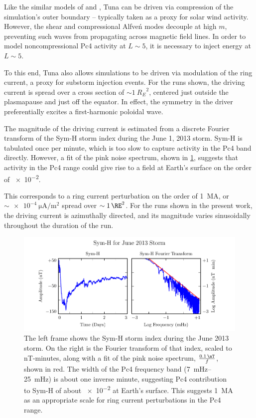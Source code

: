 \documentclass[draft,linenumbers]{agujournal}
\begin{document}

Like the similar models of \citet{lysak_2013} and \citet{waters_2013}, Tuna can be driven via compression of the simulation's outer boundary -- typically taken as a proxy for solar wind activity. However, the shear and compressional Alfve\'n modes decouple at high $m$, preventing such waves from propagating across magnetic field lines. In order to model noncompressional Pc4 activity at $L\sim5$, it is necessary to inject energy at $L\sim5$.

To this end, Tuna also allows simulations to be driven via modulation of the ring current, a proxy for substorm injection events. For the runs shown, the driving current is spread over a cross section of $\sim\SI{1}{R_E}^2$, centered just outside the plasmapause and just off the equator. In effect, the symmetry in the driver preferentially excites a first-harmonic poloidal wave.

The magnitude of the driving current is estimated from a discrete Fourier transform of the Sym-H storm index during the June 1, 2013 storm. Sym-H is tabulated once per minute, which is too slow to capture activity in the Pc4 band directly. However, a fit of the pink noise spectrum, shown in \cref{fig_symh}, suggests that activity in the Pc4 range could give rise to a field at Earth's surface on the order of \SI{e-2}{\nT}.

This corresponds to a ring current perturbation on the order of \SI{1}{\mega\A}, or $\sim\SI{e-4}{\uA/\m\squared}$ spread over $\sim\SI{1}{\RE}^2$. For the runs shown in the present work, the driving current is azimuthally directed, and its magnitude varies sinusoidally throughout the duration of the run.

\begin{figure}
    \begin{center}
    \includegraphics[width=\textwidth]{figures/fig_symh.pdf}
    \caption{
    The left frame shows the Sym-H storm index during the June 2013 storm. On the right is the Fourier transform of that index, scaled to \si{nT}-minutes, along with a fit of the pink noise spectrum, $\frac{ \SI{0.1}{\nT} }{f}$, shown in red. The width of the Pc4 frequency band (\SIrange{7}{25}{\mHz}) is about one inverse minute, suggesting Pc4 contribution to Sym-H of about \SI{e-2}{\nT} at Earth's surface. This suggests \SI{1}{\mega\A} as an appropriate scale for ring current perturbations in the Pc4 range.
    }
    \label{fig_symh}
    \end{center}
\end{figure}
\end{document}
